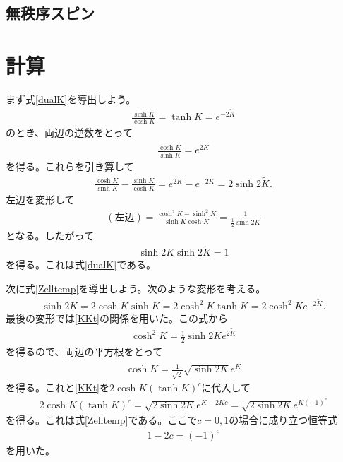 \documentclass[a4paper,12pt,dvipdfmx]{jlreq}
\newcommand{\Kt}{\widetilde{K}}
\begin{document}
\subsection{無秩序スピン}


\appendix
\section{計算}
\label{sec:calculation}
まず式\eqref{dualK}を導出しよう。
\begin{align}
  \frac{\sinh K}{\cosh K}=\tanh K = e^{-2\Kt}
  \label{KKt}
\end{align}
のとき、両辺の逆数をとって
\begin{align}
  \frac{\cosh K}{ \sinh K} = e^{2\Kt}
\end{align}
を得る。これらを引き算して
\begin{align}
  \frac{\cosh K}{\sinh K}-\frac{\sinh K}{\cosh K}=e^{2\Kt}-e^{-2\Kt}=2\sinh 2\Kt.
\end{align}
左辺を変形して
\begin{align}
  (\text{左辺})=\frac{\cosh^2K-\sinh^2 K}{\sinh K \cosh K}=\frac{1}{\frac{1}{2}\sinh 2K}
\end{align}
となる。したがって
\begin{align}
  \sinh 2K \sinh 2\Kt =1
\end{align}
を得る。これは式\eqref{dualK}である。

次に式\eqref{Zelltemp}を導出しよう。次のような変形を考える。
\begin{align}
  \sinh 2K = 2\cosh K \sinh K = 2 \cosh^2 K \tanh K =2\cosh^2 K e^{-2\Kt}.
\end{align}
最後の変形では\eqref{KKt}の関係を用いた。この式から
\begin{align}
  \cosh^2 K = \frac12 \sinh 2K e^{2\Kt}
\end{align}
を得るので、両辺の平方根をとって
\begin{align}
  \cosh K = \frac{1}{\sqrt{2}}\sqrt{\sinh 2K} e^{\Kt}
\end{align}
を得る。これと\eqref{KKt}を$2\cosh K (\tanh K)^c$に代入して
\begin{align}
  2\cosh K (\tanh K)^c
  =\sqrt{2\sinh 2K}e^{\Kt -2\Kt c}
  =\sqrt{2\sinh 2K}e^{\Kt (-1)^c}
\end{align}
を得る。これは式\eqref{Zelltemp}である。ここで$c=0,1$の場合に成り立つ恒等式
\begin{align}
  1-2c=(-1)^c
\end{align}
を用いた。
\printbibliography
\end{document}
